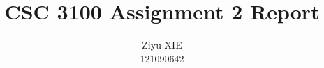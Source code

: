 \documentclass[a4paper,12pt]{article}
\begin{document}
\author{Ziyu XIE \\ 121090642}
\title{CSC 3100 Assignment 2 Report}

\maketitle






\end{document}
